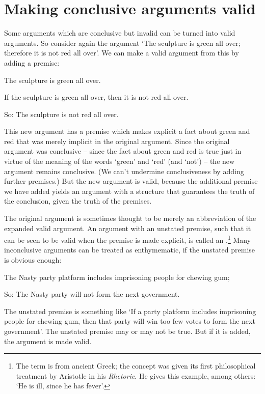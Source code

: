\section{Making conclusive arguments valid} %

Some arguments which are conclusive but invalid can be turned into valid arguments. So consider again the argument `The sculpture is green all over; therefore it is not red all over'. We can make a valid argument from this by adding a premise: 
	\begin{earg}
		\item[] The sculpture is green all over.
		\item[] \textsf{If} the sculpture is green all over, \textsf{then} it is not red all over.
		\item[So:] The sculpture is not red all over. 
	\end{earg} This new argument has a premise which makes explicit a fact about green and red that was merely implicit in the original argument. Since the original argument was conclusive – since the fact about green and red is true just in virtue of the meaning of the words `green' and `red' (and `not') – the new argument remains conclusive. (We can't undermine conclusiveness by adding further premises.) But the new argument is valid, because the additional premise we have added yields an argument with a structure that guarantees the truth of the conclusion, given the truth of the premises.

	The original argument is sometimes thought to be merely an abbreviation of the expanded valid argument. An argument with an unstated premise, such that it can be seen to be valid when the premise is made explicit, is called an .\footnote{The term is from ancient Greek; the concept was given its first philosophical treatment by Aristotle in his \emph{Rhetoric}. He gives this example, among others: `He is ill, since he has fever'.} Many inconclusive arguments can be treated as enthymematic, if the unstated premise is obvious enough:
		\begin{earg}
		\item[] The Nasty party platform includes imprisoning people for chewing gum; 
		\item[So:] The Nasty party will not form the next government. 
	\end{earg} The unstated premise is something like `If a party platform includes imprisoning people for chewing gum, then that party will win too few votes to form the next government'. The unstated premise may or may not be true. But if it is added, the argument is made valid. 

